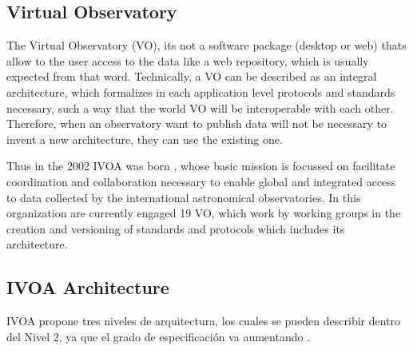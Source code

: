 \subsection{Virtual Observatory}


The Virtual Observatory (VO), its not a software package (desktop or web) thats
allow to the user access to the data like a web repository, which is usually
expected from that word. Technically, a VO can be described as an integral
architecture, which formalizes in each application level protocols and
standards necessary, such a way that the world VO will be interoperable with
each other.  Therefore, when an observatory want to publish data will not be
necessary to invent a new architecture, they can use the existing one.

Thus in the 2002 IVOA was born \cite{ivoa}, whose basic mission is focussed on
facilitate coordination and collaboration necessary to enable global and
integrated access to data collected by the international astronomical
observatories. In this organization are currently engaged 19 VO, which work by
working groups in the creation and versioning of standards and protocols which
includes its architecture.

\subsection{IVOA Architecture}

IVOA propone tres niveles de arquitectura, los cuales se pueden describir
dentro del Nivel 2, ya que el grado de especificación va aumentando \cite{arch}.

